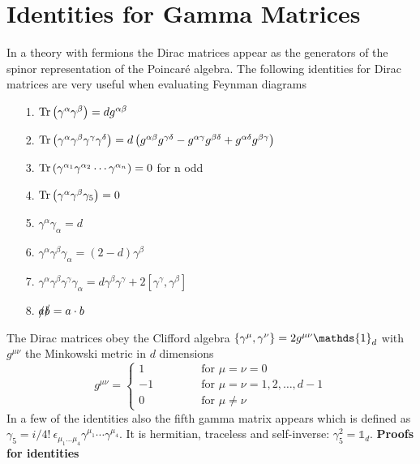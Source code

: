 \section{Identities for Gamma Matrices}
\label{app:Traceology}
In a theory with fermions the Dirac matrices appear as the generators of the spinor representation of the Poincaré algebra. The following identities for Dirac matrices are very useful when evaluating Feynman diagrams
\begin{itemize}
\item[1.] $\mathrm{Tr} \left( \gamma^{\alpha} \gamma^{\beta} \right) = dg^{\alpha\beta}$ \numberitem\label{eqn:Tr2g}

\item[2.] $\mathrm{Tr} \left( \gamma^{\alpha}\gamma^{\beta}\gamma^{\gamma}\gamma^{\delta} \right) = d \left( g^{\alpha\beta}g^{\gamma\delta} - g^{\alpha\gamma}g^{\beta\delta} + g^{\alpha\delta}g^{\beta\gamma} \right)$ \numberitem\label{eqn:Tr4g}

\item[3.] $\mathrm{Tr} \left( \gamma^{\alpha_1}\gamma^{\alpha_2} \cdots \gamma^{\alpha_n} \right) = 0$ \quad for n odd \numberitem\label{eqn:Troddg}

\item[4.] $\mathrm{Tr} \left( \gamma^{\alpha}\gamma^{\beta} \gamma_5 \right) = 0$ \numberitem\label{eqn:Tr2g5}

\item[5.] $\gamma^{\alpha}\gamma_{\alpha} = d$ \numberitem\label{eqn:2g}

\item[6.] $\gamma^{\alpha}\gamma^{\beta}\gamma_{\alpha} = \left( 2-d \right) \gamma^{\beta}$ \numberitem\label{eqn:3g}

\item[7.] $\gamma^{\alpha}\gamma^{\beta}\gamma^{\gamma}\gamma_{\alpha} = d\gamma^{\beta}\gamma^{\gamma} + 2 \left[ \gamma^{\gamma}, \gamma^{\beta} \right]$ \numberitem\label{eqn:4g}

\item[8.] $\slashed{a}\slashed{b} = a \cdot b$ \numberitem\label{eqn:fsldot}

\end{itemize}
The Dirac matrices obey the Clifford algebra $\lbr \gamma^{\mu}, \gamma^{\nu} \rbr = 2 g^{\mu\nu} \mathds{1}_d$ with $g^{\mu\nu}$ the Minkowski metric in $d$ dimensions
\begin{equation*}
 g^{\mu\nu} = 
\begin{cases}
1 \quad\qquad\qquad \text{for } \mu = \nu = 0 \\
-1 \ \qquad\qquad \text{for } \mu = \nu = 1,2,\ldots,d-1 \\
0 \quad\qquad\qquad \text{for } \mu \neq \nu
\end{cases}
\end{equation*}
In a few of the identities also the fifth gamma matrix appears which is defined as $\gamma_5 = i/4! \ \epsilon_{\mu_1 \dots \mu_4} \gamma^{\mu_1} \cdots \gamma^{\mu_4}$. It is hermitian, traceless and self-inverse: $\gamma_5^2 = \mathds{1}_d$.
\newpage
{\bf Proofs for identities}\\

